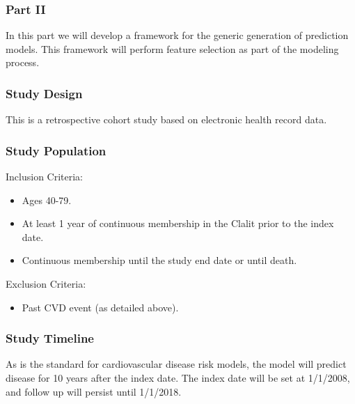 \documentclass[a4paper,12pt]{article}
\begin{document}
		\subsubsection{Part II}
		In this part we will develop a framework for the generic generation of prediction models. This framework will perform feature selection as part of the modeling process.
		
		\subsubsection*{Study Design}
		This is a retrospective cohort study based on electronic health record data.
		
		\subsubsection*{Study Population}
		Inclusion Criteria:
		\begin{itemize}
			\item Ages 40-79.
			\item At least 1 year of continuous membership in the Clalit prior to the index date.
			\item Continuous membership until the study end date or until death.
		\end{itemize}
		
		Exclusion Criteria:
		\begin{itemize}
			\item Past CVD event (as detailed above).
		\end{itemize}
		
		\subsubsection*{Study Timeline}
		As is the standard for cardiovascular disease risk models, the model will predict disease for 10 years after the index date. The index date will be set at 1/1/2008, and follow up will persist until 1/1/2018.
		
\end{document}
